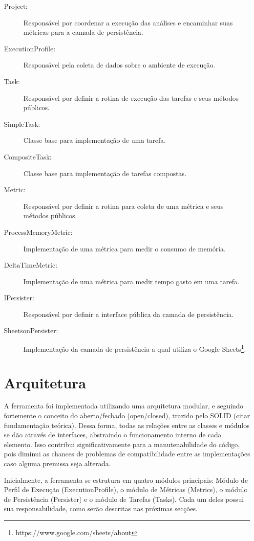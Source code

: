 \documentclass[12pt]{tcc}
\begin{document}
\begin{description}
	\item[Project:] Responsável por coordenar a execução das análises e encaminhar suas métricas para a camada de persistência.
	\item[ExecutionProfile:] Responsável pela coleta de dados sobre o ambiente de execução.
	\item[Task:] Responsável por definir a rotina de execução das tarefas e seus métodos públicos.
	\item[SimpleTask:] Classe base para implementação de uma tarefa.
	\item[CompositeTask:] Classe base para implementação de tarefas compostas.
	\item[Metric:] Responsável por definir a rotina para coleta de uma métrica e seus métodos públicos.
	\item[ProcessMemoryMetric:] Implementação de uma métrica para medir o consumo de memória.
	\item[DeltaTimeMetric:] Implementação de uma métrica para medir tempo gasto em uma tarefa.
	\item[IPersister:] Responsável por definir a interface pública da camada de persistência.
	\item[SheetsonPersister:] Implementação da camada de persistência a qual utiliza o Google Sheets\footnote{https://www.google.com/sheets/about}.
\end{description}

\section{Arquitetura}
\label{cap:diagrama_de_arq}

A ferramenta foi implementada utilizando uma arquitetura modular, e seguindo fortemente o conceito do aberto/fechado (open/closed), trazido pelo SOLID (citar fundamentação teórica). Dessa forma, todas as relações entre as classes e módulos se dão através de interfaces, abstraindo o funcionamento interno de cada elemento. Isso contribui significativamente para a manutenabilidade do código, pois diminui as chances de problemas de compatibilidade entre as implementações caso alguma premissa seja alterada.

Inicialmente, a ferramenta se estrutura em quatro módulos principais: Módulo de Perfil de Execução (ExecutionProfile), o módulo de Métricas (Metrics), o módulo de Persistência (Persister) e o módulo de Tarefas (Tasks). Cada um deles possui sua responsabilidade, como serão descritas nas próximas secções.
\end{document}
